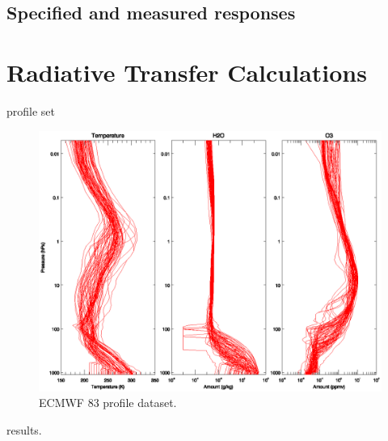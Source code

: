 \subsection{Specified and measured responses}


\section{Radiative Transfer Calculations}
 profile set
 
\begin{figure}[htp]
  \centering
  \includegraphics[scale=1]{graphics/atmprofile/ECMWF83.AtmProfile.eps}
  \caption{ECMWF 83 profile dataset.}
  \label{fig:ECMWF83.AtmProfile}
\end{figure}

results.






\clearpage




\begin{appendix}
  
  
\end{appendix}



